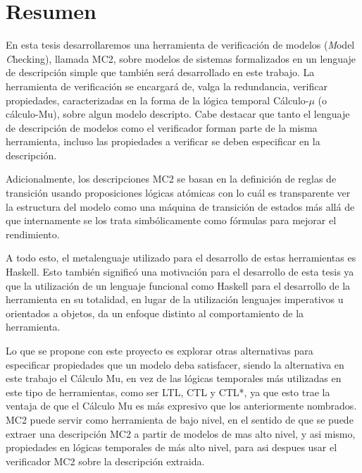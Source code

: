 % 
% 
%
\chapter*{Resumen}

En esta tesis desarrollaremos una herramienta de verificación de modelos (\emph Model \emph Checking), llamada MC2, sobre modelos de sistemas formalizados en un lenguaje de descripción simple que también será desarrollado en este trabajo. La herramienta de verificación se encargará de, valga la redundancia, verificar propiedades, caracterizadas en la forma de la lógica temporal Cálculo-$\mu$ (o cálculo-Mu), sobre algun modelo descripto. Cabe destacar que tanto el lenguaje de descripción de modelos como el verificador forman parte de la misma herramienta, incluso las propiedades a verificar se deben especificar en la descripción.

Adicionalmente, los descripciones MC2 se basan en la definición de reglas de transición usando proposiciones lógicas atómicas con lo cuál es transparente ver la estructura del modelo como una máquina de transición de estados más allá de que internamente se los trata simbólicamente como fórmulas para mejorar el rendimiento.

A todo esto, el metalenguaje utilizado para el desarrollo de estas herramientas es Haskell. Esto también significó una motivación para el desarrollo de esta tesis ya que la utilización de un lenguaje funcional como Haskell para el desarrollo de la herramienta en su totalidad, en lugar de la utilización lenguajes imperativos u orientados a objetos, da un enfoque distinto al comportamiento de la herramienta.

Lo que se propone con este proyecto es explorar otras alternativas para especificar propiedades que un modelo deba satisfacer, siendo la alternativa en este trabajo el Cálculo Mu, en vez de las lógicas temporales más utilizadas en este tipo de herramientas, como ser LTL, CTL y CTL*, ya que esto trae la ventaja de que el Cálculo Mu es más expresivo que los anteriormente nombrados. MC2 puede servir como herramienta de bajo nivel, en el sentido de que se puede extraer una descripción MC2 a partir de modelos de mas alto nivel, y asi mismo, propiedades en lógicas temporales de más alto nivel, para asi despues usar el verificador MC2 sobre la descripción extraida.


